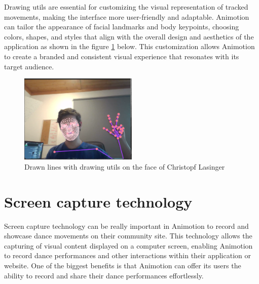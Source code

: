 Drawing utils are essential for customizing the visual representation of tracked movements, 
making the interface more user-friendly and adaptable. Animotion can tailor the appearance of facial landmarks and body keypoints, 
choosing colors, shapes, and styles that align with the overall design and aesthetics of the application as shown in the figure \ref{fig:lasifacetracking} below. This customization allows Animotion 
to create a branded and consistent visual experience that resonates with its target audience.
\\
\begin{figure}[htb]
  \centering
  \includegraphics[width=0.5\textwidth]{pics/lasifacetracking.png}
  \caption{Drawn lines with drawing utils on the face of Christopf Lasinger}
  \label{fig:lasifacetracking}
\end{figure}

\section{Screen capture technology}
Screen capture technology can be really important in Animotion to record and showcase dance movements on their 
community site. This technology allows the capturing of visual content displayed on a computer screen, enabling Animotion to 
record dance performances and other interactions within their application or website. One of the biggest benefits is that Animotion can offer
its users the ability to record and share their dance performances effortlessly. 

